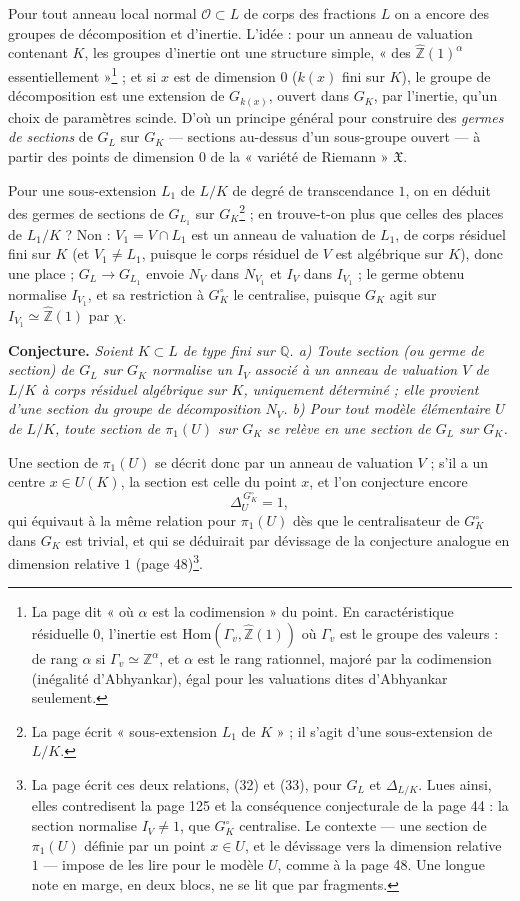 \documentclass[11pt,a4paper]{article}
\begin{document}
Pour tout anneau local normal $\mathcal{O} \subset L$ de corps des fractions
$L$ on a encore des groupes de décomposition et d'inertie. L'idée : pour un
anneau de valuation contenant $K$, les groupes d'inertie ont une structure
simple, « des $\widehat{\mathbb{Z}}(1)^{\alpha}$ essentiellement »\footnote{La
page dit « où $\alpha$ est la codimension » du point. En caractéristique
résiduelle $0$, l'inertie est $\mathrm{Hom}(\Gamma_v, \widehat{\mathbb{Z}}(1))$
où $\Gamma_v$ est le groupe des valeurs : de rang $\alpha$ si $\Gamma_v \simeq
\mathbb{Z}^\alpha$, et $\alpha$ est le rang rationnel, majoré par la
codimension (inégalité d'Abhyankar), égal pour les valuations dites
d'Abhyankar seulement.} ; et si $x$ est de dimension $0$ ($k(x)$ fini sur $K$),
le groupe de décomposition est une extension de $G_{k(x)}$, ouvert dans $G_K$,
par l'inertie, qu'un choix de paramètres scinde. D'où un principe général
pour construire des \emph{germes de sections} de $G_L$ sur $G_K$ — sections
au-dessus d'un sous-groupe ouvert — à partir des points de dimension $0$ de la
« variété de Riemann » $\mathfrak{X}$.

Pour une sous-extension $L_1$ de $L/K$ de degré de transcendance $1$, on en
déduit des germes de sections de $G_{L_1}$ sur $G_K$\footnote{La page écrit
« sous-extension $L_1$ de $K$ » ; il s'agit d'une sous-extension de $L/K$.} ; en
trouve-t-on plus que celles des places de $L_1/K$ ? Non : $V_1 = V \cap L_1$
est un anneau de valuation de $L_1$, de corps résiduel fini sur $K$ (et $V_1 \ne
L_1$, puisque le corps résiduel de $V$ est algébrique sur $K$), donc une place ;
$G_L \to G_{L_1}$ envoie $N_V$ dans $N_{V_1}$ et $I_V$ dans $I_{V_1}$ ; le germe
obtenu normalise $I_{V_1}$, et sa restriction à $G_K^{\circ}$ le centralise,
puisque $G_K$ agit sur $I_{V_1} \simeq \widehat{\mathbb{Z}}(1)$ par $\chi$.

\textbf{Conjecture.} \emph{Soient $K \subset L$ de type fini sur $\mathbb{Q}$.
a) Toute section (ou germe de section) de $G_L$ sur $G_K$ normalise un $I_V$
associé à un anneau de valuation $V$ de $L/K$ à corps résiduel algébrique sur
$K$, uniquement déterminé ; elle provient d'une section du groupe de
décomposition $N_V$. b) Pour tout modèle élémentaire $U$ de $L/K$, toute
section de $\pi_1(U)$ sur $G_K$ se relève en une section de $G_L$ sur $G_K$.}

Une section de $\pi_1(U)$ se décrit donc par un anneau de valuation $V$ ; s'il
a un centre $x \in U(K)$, la section est celle du point $x$, et l'on conjecture
encore
\[
\Delta_U^{\,G_K^{\circ}} = 1,
\]
qui équivaut à la même relation pour $\pi_1(U)$ dès que le centralisateur de
$G_K^{\circ}$ dans $G_K$ est trivial, et qui se déduirait par dévissage de la
conjecture analogue en dimension relative $1$ (page 48)\footnote{La page écrit
ces deux relations, (32) et (33), pour $G_L$ et $\Delta_{L/K}$. Lues ainsi, elles
contredisent la page 125 et la conséquence conjecturale de la page 44 : la
section normalise $I_V \ne 1$, que $G_K^{\circ}$ centralise. Le contexte — une
section de $\pi_1(U)$ définie par un point $x \in U$, et le dévissage vers la
dimension relative $1$ — impose de les lire pour le modèle $U$, comme à la page
48. Une longue note en marge, en deux blocs, ne se lit que par fragments.}.
\end{document}
